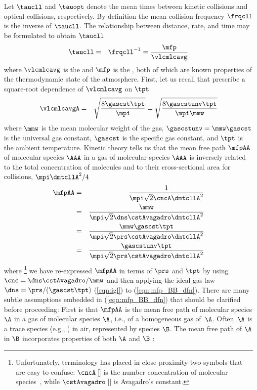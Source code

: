 \documentclass[12pt]{article}
\begin{document}
Let $\taucll$ and $\tauopt$ denote the mean times between kinetic
collisions and optical collisions, respectively.
By definition the mean collision frequency $\frqcll$ is the inverse
of $\taucll$.
The relationship between distance, rate, and time may be formulated to 
obtain $\taucll$ 
\begin{eqnarray}
\taucll & = & \frqcll^{-1} = \frac{\mfp}{\vlcmlcavg}
\label{eqn:tau_cll_dfn}
\end{eqnarray}
where $\vlcmlcavg$ is the  
and $\mfp$ is the , both of which are
known properties of the thermodynamic state of the atmosphere. 
First, let us recall that  
prescribe a square-root dependence of $\vlcmlcavg$ on $\tpt$ 
\begin{eqnarray}
\vlcmlcavgA & = & \sqrt{\frac{8 \gascst \tpt}{\mpi}} = \sqrt{\frac{8 \gascstunv \tpt}{\mpi \mmw}} 
\label{eqn:vlc_mlc_avg_dfn}
\end{eqnarray}
where $\mmw$ is the mean molecular weight of the gas,
$\gascstunv = \mmw \gascst$ is the universal gas constant,
$\gascst$ is the specific gas constant, and $\tpt$ is the ambient
temperature.  
Kinetic theory tells us \citep[][p.~457]{Sep97} that the mean free
path $\mfpAA$ of molecular species $\AAA$ in a gas of molecular
species $\AAA$ is inversely related to the total concentration of
molecules and to their cross-sectional area for collisions,
$\mpi\dmtcllA^{2}/4$ 
\begin{eqnarray}
\label{eqn:mfp_BB_dfn}
\mfpAA & = & \frac{1}{\mpi \sqrt{2} \cncA \dmtcllA^{2}} \\
& = & \frac{\mmw}{\mpi \sqrt{2} \dns \cstAvagadro \dmtcllA^{2}} \nonumber \\
& = & \frac{\mmw \gascst \tpt}{\mpi \sqrt{2} \prs \cstAvagadro \dmtcllA^{2}} \nonumber \\
& = & \frac{\gascstunv \tpt}{\mpi \sqrt{2} \prs \cstAvagadro \dmtcllA^{2}}
\label{eqn:mfp_dfn}
\end{eqnarray}
where%
\footnote{Unfortunately, terminology has placed in close proximity two 
  symbols that are easy to confuse: $\cncA$\,[\nbrxmC] is the number
  concentration of molecular species~\A, while $\cstAvagadro$\,[\nbrxmol] is
  Avagadro's constant.} 
we have re-expressed $\mfpAA$ in terms of $\prs$ and $\tpt$
by using $\cnc = \dns \cstAvagadro / \mmw$ and then
applying the ideal gas law $\dns = \prs / (\gascst \tpt)$
(\ref{eqn:igl}) to (\ref{eqn:mfp_BB_dfn}). 
There are many subtle assumptions embedded in (\ref{eqn:mfp_BB_dfn})
that should be clarified before proceeding:
First is that $\mfpAA$ is the mean free path of molecular species
$\A$ in a gas of molecular species $\A$, i.e., of a homogeneous
gas of~$\A$.
Often~$\A$ is a trace species (e.g., \COd) in air, represented by
species $\B$. 
The mean free path of $\A$ in $\B$ incorporates properties of both
$\A$ and $\B$ \citep[][p.~457]{Sep97}:
\end{document}
